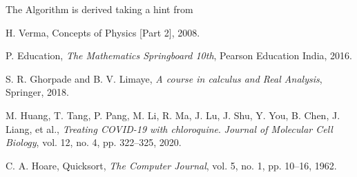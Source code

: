\documentclass{article}
\begin{document}
The Algorithm is derived taking a hint from \cite{hoare1962quicksort}
 \newpage
\begin{thebibliography}{7}
H. Verma, Concepts of Physics [Part 2], 2008.

P. Education, \textit{The Mathematics Springboard 10th}, Pearson Education India, 2016.

S. R. Ghorpade and B. V. Limaye, \textit{A course in calculus and Real Analysis}, Springer, 2018.

M. Huang, T. Tang, P. Pang, M. Li, R. Ma, J. Lu, J. Shu, Y. You, B. Chen, J. Liang, et al., \emph{Treating COVID-19 with chloroquine}. \emph{Journal of Molecular Cell Biology}, vol. 12, no. 4, pp. 322–325, 2020.


C. A. Hoare, Quicksort, \textit{The Computer Journal}, vol. 5, no. 1, pp. 10–16, 1962.

\end{thebibliography}
\end{document}
